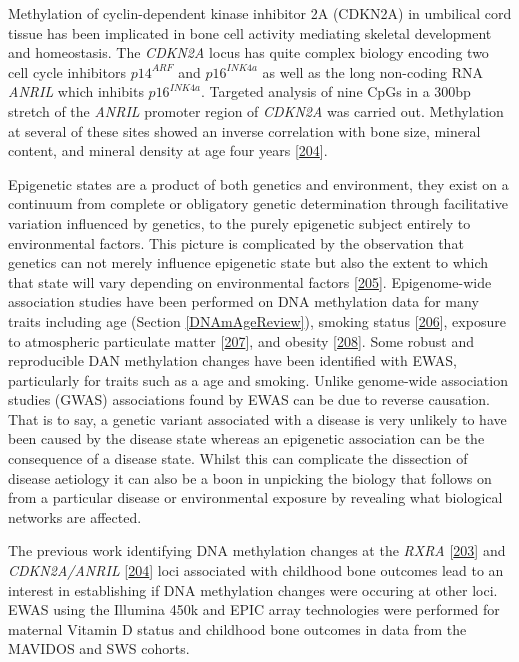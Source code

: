 \documentclass[
]{book}
\begin{document}
Methylation of cyclin-dependent kinase inhibitor 2A (CDKN2A) in umbilical cord tissue has been implicated in bone cell activity mediating skeletal development and homeostasis.
The \emph{CDKN2A} locus has quite complex biology encoding two cell cycle inhibitors \(p14^{ARF}\) and \(p16^{INK4a}\) as well as the long non-coding RNA \emph{ANRIL} which inhibits \(p16^{INK4a}\).
Targeted analysis of nine CpGs in a 300bp stretch of the \emph{ANRIL} promoter region of \emph{CDKN2A} was carried out.
Methylation at several of these sites showed an inverse correlation with bone size, mineral content, and mineral density at age four years {[}\protect\hyperlink{ref-Curtis2017}{204}{]}.

Epigenetic states are a product of both genetics and environment, they exist on a continuum from complete or obligatory genetic determination through facilitative variation influenced by genetics, to the purely epigenetic subject entirely to environmental factors.
This picture is complicated by the observation that genetics can not merely influence epigenetic state but also the extent to which that state will vary depending on environmental factors {[}\protect\hyperlink{ref-Holland2017}{205}{]}.
Epigenome-wide association studies have been performed on DNA methylation data for many traits including age (Section \ref{DNAmAgeReview}), smoking status {[}\protect\hyperlink{ref-Dogan2017}{206}{]}, exposure to atmospheric particulate matter {[}\protect\hyperlink{ref-Dai2016}{207}{]}, and obesity {[}\protect\hyperlink{ref-Wahl2016}{208}{]}.
Some robust and reproducible DAN methylation changes have been identified with EWAS, particularly for traits such as a age and smoking.
Unlike genome-wide association studies (GWAS) associations found by EWAS can be due to reverse causation.
That is to say, a genetic variant associated with a disease is very unlikely to have been caused by the disease state whereas an epigenetic association can be the consequence of a disease state.
Whilst this can complicate the dissection of disease aetiology it can also be a boon in unpicking the biology that follows on from a particular disease or environmental exposure by revealing what biological networks are affected.

The previous work identifying DNA methylation changes at the \emph{RXRA} {[}\protect\hyperlink{ref-Harvey2014d}{203}{]} and \emph{CDKN2A/ANRIL} {[}\protect\hyperlink{ref-Curtis2017}{204}{]} loci associated with childhood bone outcomes lead to an interest in establishing if DNA methylation changes were occuring at other loci.
EWAS using the Illumina 450k and EPIC array technologies were performed for maternal Vitamin D status and childhood bone outcomes in data from the MAVIDOS and SWS cohorts.
\end{document}
